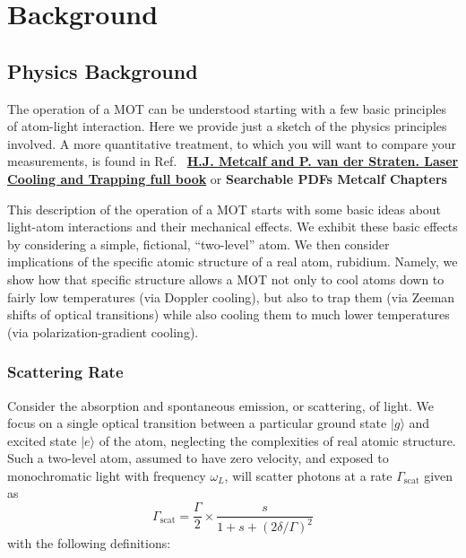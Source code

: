 \documentclass{../lab}
\begin{document}
\section{Background}

\subsection{Physics Background}

The operation of a MOT can be understood starting with a few basic principles of atom-light interaction. Here we provide just a sketch of the physics principles involved. A more quantitative treatment, to which you will want to compare your measurements, is found in Ref.~\cite{Metcalf} \href{http://books.google.com/books?id=hDJPnSFh-g0C&dq=H.J.+Metcalf+and+P.+van+der+Straeten.+Laser+Cooling+and+Trapping+book&printsec=frontcover&source=bn&hl=en&ei=jMWaS4eRD4TuswPgytidAg&sa=X&oi=book\_result&ct=result&resnum=4&ved=0CBAQ6AEwAw#v=onepage&q=&f=false}{\textbf{H.J. Metcalf and P. van der Straten. Laser Cooling and Trapping full book}} or \textbf{Searchable PDFs Metcalf Chapters}

This description of the operation of a MOT starts with some basic ideas about light-atom interactions and their mechanical effects. We exhibit these basic effects by considering a simple, fictional, ``two-level'' atom. We then consider implications of the specific atomic structure of a real atom, rubidium. Namely, we show how that specific structure allows a MOT not only to cool atoms down to fairly low temperatures (via Doppler cooling), but also to trap them (via Zeeman shifts of optical transitions) while also cooling them to much lower temperatures (via polarization-gradient cooling).

\subsubsection{Scattering Rate}

Consider the absorption and spontaneous emission, or scattering, of light. We focus on a single optical transition between a particular ground state $|g\rangle$ and excited state $|e\rangle$ of the atom, neglecting the complexities of real atomic structure. Such a two-level atom, assumed to have zero velocity, and exposed to monochromatic light with frequency $\omega_L$, will scatter photons at a rate $\Gamma_\text{scat}$ given as
\begin{equation}
    \Gamma_\text{scat} = \frac{\Gamma}{2} \times \frac{s}{1 + s + (2\delta/\Gamma)^2}
\end{equation}
with the following definitions:
\end{document}
